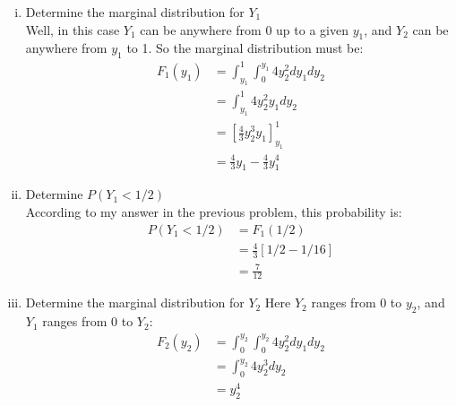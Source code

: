 \documentclass{scrartcl}
\begin{document}
\begin{enumerate}
\begin{enumerate}[i.]
      \item Determine the marginal distribution for $Y_1$\\
        Well, in this case $Y_1$ can be anywhere from 0 up to a given $y_1$, and $Y_2$ can be anywhere from $y_1$ to 1. So the marginal distribution must be:
        \begin{align*}
          F_1(y_1) &= \int_{y_1}^{1}\int_0^{y_1}4y_2^2dy_1dy_2\\
          &= \int_{y_1}^{1}4y_2^2y_1dy_2\\
          &= \left[\frac{4}{3}y_2^3y_1\right]_{y_1}^1\\
          &= \frac{4}{3}y_1 - \frac{4}{3}y_1^4
        \end{align*}
        
      \item Determine $P(Y_1<1/2)$\\
        According to my answer in the previous problem, this probability is:
        \begin{align*}
          P(Y_1<1/2) &= F_1(1/2)\\
          &= \frac{4}{3}\left[1/2 - 1/16\right]\\
          &= \frac{7}{12}
        \end{align*}
        
      \item Determine the marginal distribution for $Y_2$
        Here $Y_2$ ranges from 0 to $y_2$, and $Y_1$ ranges from 0 to $Y_2$:
        \begin{align*}
          F_2(y_2) &= \int_{0}^{y_2}\int_0^{y_2}4y_2^2dy_1dy_2\\
          &= \int_{0}^{y_2}4y_2^3dy_2\\
          &= y_2^4
        \end{align*}
        
    \end{enumerate}
\end{enumerate}
\end{document}
